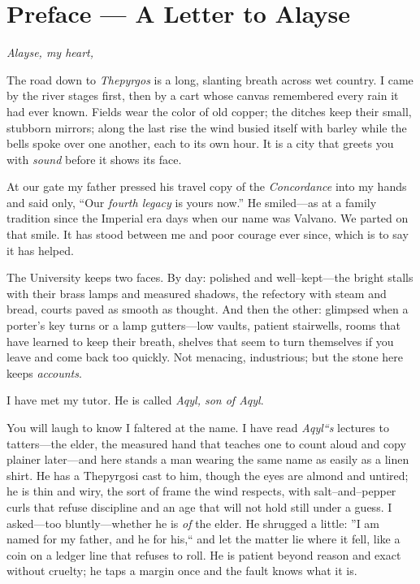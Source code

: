 \documentclass[11pt]{article}
\numberwithin{equation}{section} %
\theoremstyle{plain} %
\theoremstyle{definition} %
\theoremstyle{remark} %
\begin{document}
\clearpage
\section*{Preface --- A Letter to Alayse}
\label{sec:preface-markus-to-alayse}
{}

\noindent\textit{Alayse, my heart,}

The road down to \textit{Thepyrgos} is a long, slanting breath across wet country. I came by the river stages first, then by a cart whose canvas remembered every rain it had ever known. Fields wear the color of old copper; the ditches keep their small, stubborn mirrors; along the last rise the wind busied itself with barley while the bells spoke over one another, each to its own hour. It is a city that greets you with \emph{sound} before it shows its face.

At our gate my father pressed his travel copy of the \emph{Concordance} into my hands and said only, ``Our \emph{fourth legacy} is yours now.'' He smiled---as at a family tradition since the Imperial era days when our name was Valvano. We parted on that smile. It has stood between me and poor courage ever since, which is to say it has helped.

\medskip
The University keeps two faces. By day: polished and well--kept---the bright stalls with their brass lamps and measured shadows, the refectory with steam and bread, courts paved as smooth as thought. And then the other: glimpsed when a porter's key turns or a lamp gutters---low vaults, patient stairwells, rooms that have learned to keep their breath, shelves that seem to turn themselves if you leave and come back too quickly. Not menacing, industrious; but the stone here keeps \emph{accounts}.

I have met my tutor. He is called \textit{Aqyl, son of Aqyl}.

You will laugh to know I faltered at the name. I have read \emph{Aqyl``s} lectures to tatters---the elder, the measured hand that teaches one to count aloud and copy plainer later---and here stands a man wearing the same name as easily as a linen shirt. He has a Thepyrgosi cast to him, though the eyes are almond and untired; he is thin and wiry, the sort of frame the wind respects, with salt--and--pepper curls that refuse discipline and an age that will not hold still under a guess. I asked---too bluntly---whether he is \emph{of} the elder. He shrugged a little: ''I am named for my father, and he for his,`` and let the matter lie where it fell, like a coin on a ledger line that refuses to roll. He is patient beyond reason and exact without cruelty; he taps a margin once and the fault knows what it is.
\end{document}
